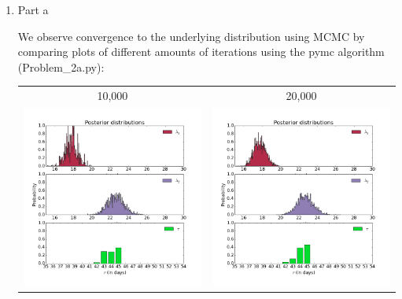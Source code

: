 \documentclass[]{article}
\begin{document}
\begin{enumerate}
\newpage
\item {\large Part a} 

We observe convergence to the underlying distribution using MCMC by comparing plots of different amounts of iterations using the pymc algorithm (Problem\_2a.py): 

\vspace{1em}
\begin{adjustbox}{center}
\begin{tabular}{cc}
10,000 & 20,000 \\
\includegraphics[scale = 0.22]{n_10000.png}  & \includegraphics[scale = 0.22]{n_20000.png} \\

\end{tabular}
\end{adjustbox}
\end{enumerate}
\end{document}
